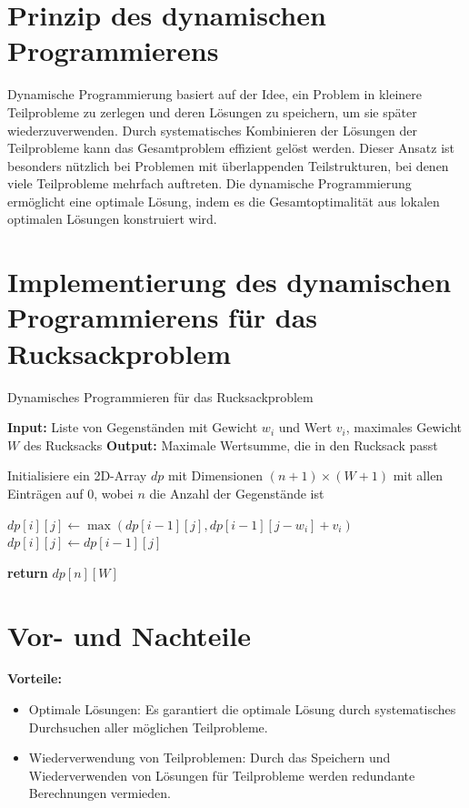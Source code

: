 \documentclass[12pt]{report}
\begin{document}
\section{Prinzip des dynamischen Programmierens}
Dynamische Programmierung basiert auf der Idee, ein Problem in kleinere Teilprobleme zu zerlegen und deren Lösungen zu speichern, um sie später wiederzuverwenden. Durch systematisches Kombinieren der Lösungen der Teilprobleme kann das Gesamtproblem effizient gelöst werden. Dieser Ansatz ist besonders nützlich bei Problemen mit überlappenden Teilstrukturen, bei denen viele Teilprobleme mehrfach auftreten. Die dynamische Programmierung ermöglicht eine optimale Lösung, indem es die Gesamtoptimalität aus lokalen optimalen Lösungen konstruiert wird.\cite{cormen2022introduction}

\section{Implementierung des dynamischen Programmierens für das Rucksackproblem}
\begin{algorithm}
	\caption{Dynamisches Programmieren für das Rucksackproblem}
	\begin{algorithmic}[1]
		\State \textbf{Input:} Liste von Gegenständen mit Gewicht $w_i$ und Wert $v_i$, maximales Gewicht $W$ des Rucksacks
		\State \textbf{Output:} Maximale Wertsumme, die in den Rucksack passt
		
		\State Initialisiere ein 2D-Array $dp$ mit Dimensionen $(n+1) \times (W+1)$ mit allen Einträgen auf $0$, wobei $n$ die Anzahl der Gegenstände ist
		
		\State $dp[i][j] \gets \max(dp[i-1][j], dp[i-1][j-w_i] + v_i)$
		\Else
		\State $dp[i][j] \gets dp[i-1][j]$
		\EndIf
		\EndFor
		\EndFor
		
		\State \textbf{return} $dp[n][W]$
	\end{algorithmic}
\end{algorithm}


\section{Vor- und Nachteile}
\textbf{Vorteile:}
\begin{itemize}
	\item Optimale Lösungen: Es garantiert die optimale Lösung durch systematisches Durchsuchen aller möglichen Teilprobleme.
	\item Wiederverwendung von Teilproblemen: Durch das Speichern und Wiederverwenden von Lösungen für Teilprobleme werden redundante Berechnungen vermieden.
\end{itemize}
\end{document}
